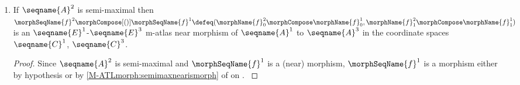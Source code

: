 \documentclass{article}
\begin{document}
\begin{lemma}
\begin{enumerate}
\begin{proof}
\begin{figure}[ht]
\[ \bfig
\node x(0,-1000)[u^1]
\node up1(500,0)[U'^1]
\node upp1(500,-1000)[U''^1]
\node vpp1(500,-2000)[V''^1]
\node vp1(500,-2500)[V'^1]
\node up2(1500,0)[U'^2]
\node uint(1500,-500)[{I^{2,3} = U'^2 \cap \morphName{f}^{-1}_0[U^3]}]
\node upp2(1500,-1000)[U''^2]
\node vpp2(1500,-2000)[V''^2]
\node vhp2(1500,-2500)[\hat{V}'^2]
\node E3(2500,0)[E^3]
\node u3(2500,-500)[U^3]
\node up3(2500,-1000)[U'^3]
\node vhp3(2500,-2000)[\hat{V}'^3]
\node v3(2500,-1500)[V^3]
\node c3(2500,-2500)[C^3]
\arrow |a|/^{ (}->/[x`upp1;\morphName{i}]
\arrow |a|[up1`up2;\morphName{f}^1_0]
\arrow |r|/^{ (}->/[upp1`up1;\morphName{i}]
\arrow |a|[upp1`upp2;\morphName{f}^1_0]
\arrow |r|/>->>/[upp1`vpp1;\phi^1]
\arrow |l|//[upp1`vpp1;\iso]
\arrow |a|[vpp1`vpp2;\morphName{f}^1_1]
\arrow |r|/^{ (}->/[vpp1`vp1;\morphName{i}]
\arrow |a|[vp1`vhp2;\morphName{f}^1_1]
\arrow |a|[up2`E3;\morphName{f}^2_0]
\arrow |r|/^{ (}->/[uint`up2;\morphName{i}]
\arrow |a|[uint`u3;\morphName{f}^2_0]
\arrow |r|/^{ (}->/[upp2`uint;\morphName{i}]
\arrow |a|[upp2`up3;\morphName{f}^2_0]
\arrow |r|/>->>/[upp2`vpp2;\phi'^2]
\arrow |l|//[upp2`vpp2;\iso]
\arrow |a|[vpp2`vhp3;\morphName{f}^2_1]
\arrow |a|/^{ (}->/[vpp2`vhp2;\morphName{i}]
\arrow |a|[vhp2`c3;\morphName{f}^2_1]
\arrow |r|/^{ (}->/[u3`E3;\morphName{i}]
\arrow |r|/^{ (}->/[up3`u3;\morphName{i}]
\arrow |r|/>->>/[up3`vhp3;\phi'^3]
\arrow |l|//[up3`vhp3;\iso]
\arrow |r|/^{ (}->/[vhp3`c3;\morphName{i}]
\efig \]
\caption{Completed composition of M-atlas morphisms}
\label{fig:morphcompM3}
\end{figure}

Define $U''^1 \defeq \morphName{f}^{1-1}_0[U''^2]$,
$
  V''^1 \defeq
  \morphName{f}^{1-1}_1[V''^2] =
  \phi^1[U''^1]
$,
 is commutative.
\end{proof}

\item
\label{M-morphcomp:nearcompnear1}
If $\seqname{A}^2$ is semi-maximal then
$
  \morphSeqName{f}^2 \morphCompose[()] \morphSeqName{f}^1 \defeq
  (
    \morphName{f}^2_0 \morphCompose \morphName{f}^1_0,
    \morphName{f}^2_1 \morphCompose \morphName{f}^1_1
  )
$
is an $\seqname{E}^1$-$\seqname{E}^3$ m-atlas near morphism of
$\seqname{A}^1$ to $\seqname{A}^3$ in the coordinate spaces
$\seqname{C}^1$, $\seqname{C}^3$.

\begin{proof}
Since $\seqname{A}^2$ is semi-maximal and $\morphSeqName{f}^1$ is a
(near) morphism, $\morphSeqName{f}^1$
is a morphism either by hypothesis
or by \cref{M-ATLmorph:semimaxnearismorph} of
{
  \showlabelsinline
   on
  .
}


\end{proof}
\end{enumerate}
\end{lemma}
\end{document}
